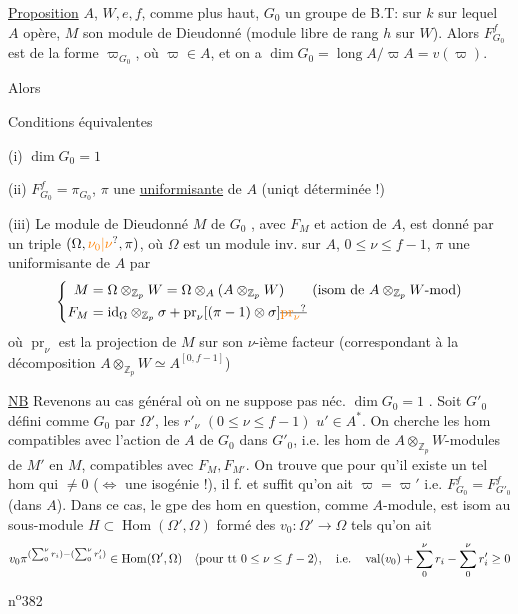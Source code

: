 \uline{Proposition} $A$,  $W,e,f$,  comme plus haut, $G_0$ un groupe de B.T:  sur  $k$ sur lequel $A$ opère,  $M$ son module de Dieudonné (module libre de rang $h$ sur $W$). Alors $F_{G_0}^f$ est de la forme $\varpi_{G_0}$, où $\varpi\in A$, et on a $\dim G_0=\operatorname{long} A/\varpi A=v(\varpi)$.

Alors 

Conditions équivalentes

(i) $\dim G_0=1$

(ii) $F_{G_0}^f=\pi_{G_0}$, $\pi$ une \uline{uniformisante} de $A$ (uniqt déterminée !)

(iii) Le module de Dieudonné $M$ de $G_0$ , avec $F_M$ et action de $A$, est donné par un triple $(\Omega,\unsure{\nu_0|\nu},\pi)$, où $\Omega$ est un module inv. sur $A$, $0\leq\nu\leq f-1$, $\pi$ une uniformisante de $A$ par
\[
\left\{\begin{aligned}
M&=\Omega\otimes_{\mathbb Z_p}W=\Omega\otimes_A(A\otimes_{\mathbb Z_p}W)\qquad(\text{isom de }A\otimes_{\mathbb Z_p}W\text{-mod})\\
F_M&=\mathrm{id}_\Omega\otimes_{\mathbb Z_p}\sigma+\operatorname{pr}_{\nu}[(\pi-1)\otimes\sigma]\deleted{\unsure{\operatorname{pr}_{\nu}}}
\end{aligned}\right.
\]
où $\operatorname{pr}_\nu$ est la  projection de $M$ sur son $\nu$-ième facteur  (correspondant à la décomposition $A\otimes_{\mathbb Z_p}W\simeq A^{[0,f-1]}$)


\uline{NB} Revenons au cas général où on ne suppose pas néc. $\dim G_0=1$ . Soit $G'_0$ défini comme $G_0$ par $\Omega'$,  les $r'_\nu$ $(0\leq\nu\leq f-1)$ $u'\in A^*$. On cherche les hom compatibles avec l'action de $A$ de $G_0$ dans $G'_0$, i.e. les hom de $A\otimes_{\mathbb Z_p}W$-modules de $M'$ en $M$, compatibles avec $F_M,F_{M'}$. On trouve  que pour qu'il existe un tel hom qui  $\ne 0$ ($\Longleftrightarrow$ une isogénie !), il f. et suffit qu'on ait $\varpi=\varpi'$ i.e. $F_{G_0}^f=F_{G'_0}^f$ (dans $A$). Dans ce cas,  le gpe des hom en question, comme $A$-module, est isom au  sous-module $H\subset\operatorname{Hom}(\Omega',\Omega)$ formé des $v_0:\Omega'\to\Omega$ tels qu'on ait
\[
v_0\pi^{(\sum_0^\nu r_i)-(\sum_0^\nu r'_i)}\in\operatorname{Hom}(\Omega',\Omega)\quad\inserted{\text{pour tt }0\leq\nu\leq f-2},\quad\text{i.e.}\quad \operatorname{val}(v_0)+\sum_0^\nu r_i-\sum_0^\nu r'_i\geq 0
\]
\hfill n\textsuperscript{o}382

